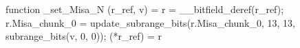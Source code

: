 function _set_Misa_N (r_ref, v) = {
    r = __bitfield_deref(r_ref);
    r.Misa_chunk_0 = update_subrange_bits(r.Misa_chunk_0, 13, 13, subrange_bits(v, 0, 0));
    (*r_ref) = r
}
